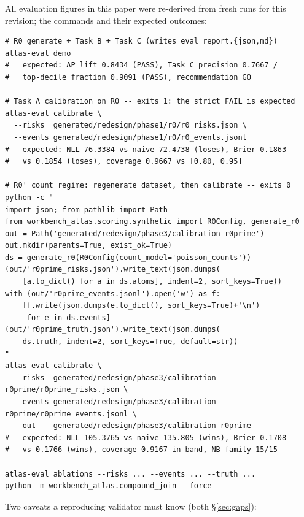 \documentclass[11pt]{article}
\begin{document}
All evaluation figures in this paper were re-derived from fresh runs for
this revision; the commands and their expected outcomes:

\small
\begin{verbatim}
# R0 generate + Task B + Task C (writes eval_report.{json,md})
atlas-eval demo
#   expected: AP lift 0.8434 (PASS), Task C precision 0.7667 /
#   top-decile fraction 0.9091 (PASS), recommendation GO

# Task A calibration on R0 -- exits 1: the strict FAIL is expected
atlas-eval calibrate \
  --risks  generated/redesign/phase1/r0/r0_risks.json \
  --events generated/redesign/phase1/r0/r0_events.jsonl
#   expected: NLL 76.3384 vs naive 72.4738 (loses), Brier 0.1863
#   vs 0.1854 (loses), coverage 0.9667 vs [0.80, 0.95]

# R0' count regime: regenerate dataset, then calibrate -- exits 0
python -c "
import json; from pathlib import Path
from workbench_atlas.scoring.synthetic import R0Config, generate_r0
out = Path('generated/redesign/phase3/calibration-r0prime')
out.mkdir(parents=True, exist_ok=True)
ds = generate_r0(R0Config(count_model='poisson_counts'))
(out/'r0prime_risks.json').write_text(json.dumps(
    [a.to_dict() for a in ds.atoms], indent=2, sort_keys=True))
with (out/'r0prime_events.jsonl').open('w') as f:
    [f.write(json.dumps(e.to_dict(), sort_keys=True)+'\n')
     for e in ds.events]
(out/'r0prime_truth.json').write_text(json.dumps(
    ds.truth, indent=2, sort_keys=True, default=str))
"
atlas-eval calibrate \
  --risks  generated/redesign/phase3/calibration-r0prime/r0prime_risks.json \
  --events generated/redesign/phase3/calibration-r0prime/r0prime_events.jsonl \
  --out    generated/redesign/phase3/calibration-r0prime
#   expected: NLL 105.3765 vs naive 135.805 (wins), Brier 0.1708
#   vs 0.1766 (wins), coverage 0.9167 in band, NB family 15/15

atlas-eval ablations --risks ... --events ... --truth ...
python -m workbench_atlas.compound_join --force
\end{verbatim}
\normalsize

Two caveats a reproducing validator must know (both \S\ref{sec:gaps}):
\end{document}
